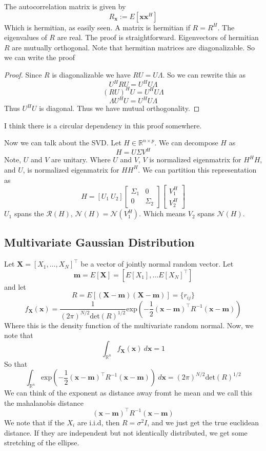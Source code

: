 \documentclass[a4paper]{article}
\begin{document}
The autocorrelation matrix is given by 
\[
    R_{\mathbf{x}} := E \left[ \mathbf{x} \mathbf{x}^H \right]
\]
Which is hermitian, as easily seen. A matrix is hermitian if $R = R^H$. The eigenvalues of $R$ are real. The proof is straightforward. Eigenvectors of hermitian $R$ are mutually orthogonal. Note that hermitian matrices are diagonalizable. So we can write the proof

\begin{proof}
   Since $R$ is diagonalizable we have $RU = U\Lambda$. So we can rewrite this as 
   \[
       U^HRU = U^HU\Lambda
   \]
   \[
       (RU)^HU = U^HU\Lambda
   \]
   \[
       \Lambda U^HU = U^HU\Lambda
   \]
   Thus $U^HU$ is diagonal. Thus we have mutual orthogonality.
\end{proof}
I think there is a circular dependency in this proof somewhere.

Now we can talk about the SVD. Let $H \in \mathds{R}^{n \times p}$. We can decompose $H$ as 
\[
    H = U \Sigma V^H
\]
Note, $U$ and $V$ are unitary. Where $U$ and $V$, $V$ is normalized eigenmatrix for $H^HH$, and $U$, is normalized eigenmatrix for $HH^H$. We can partition this representation as 
\[
    H = [U_1\ U_2]
    \begin{bmatrix}
        \Sigma_1 & 0 \\
        0 & \Sigma_2
    \end{bmatrix}
    \begin{bmatrix}
        V_1^H \\
        V_2^H
    \end{bmatrix}
\]
$U_1$ spans the $\mathcal{R}(H)$, $\mathcal{N}(H) = \mathcal{N}(V_1^H)$. Which means $V_2$ spans $\mathcal{N}(H)$.

\subsection*{Multivariate Gaussian Distribution}%
Let $\mathbf{X} = [X_1, \dots, X_N]^\top$ be a vector of jointly normal random vector. Let
\[
  \mathbf{m} = E[\mathbf{X}] = [E[X_1], \dots E[X_N]^\top]
\]
and let 
\[
  R = E[(\mathbf{X} - \mathbf{m})(\mathbf{X} - \mathbf{m})] = \{r_{ij}\}
\]
\[
  f_{\mathbf{X}}(\mathbf{x}) = \frac{1}{(2\pi)^{N/2}\text{det}(R)^{1/2}} \text{exp} \left( -\frac{1}{2} (\mathbf{x} - \mathbf{m})^\top R^{-1} (\mathbf{x} - \mathbf{m})\right)
\]
Where this is the density function of the multivariate random normal. Now, we note that
\[
  \int_{\mathds{R}^n} f_{\mathbf{X}}(\mathbf{x})\ d\mathbf{x} = 1
\]
So that 
\[
  \int_{\mathds{R}^n} \text{exp} \left( -\frac{1}{2} (\mathbf{x} - \mathbf{m})^\top R^{-1} (\mathbf{x} - \mathbf{m})  \right)\ d\mathbf{x} = (2\pi)^{N/2} \text{det}(R)^{1/2}
\]
We can think of the exponent as distance away fromt he mean and we call this the mahalanobis distance 
\[
  (\mathbf{x} - \mathbf{m})^\top R^{-1}(\mathbf{x} - \mathbf{m})
\]
We note that if the $X_i$ are i.i.d, then $R = \sigma^2 I$, and we just get the true euclidean distance. If they are independent but not identically distributed, we get some stretching of the ellipse. 
\end{document}
